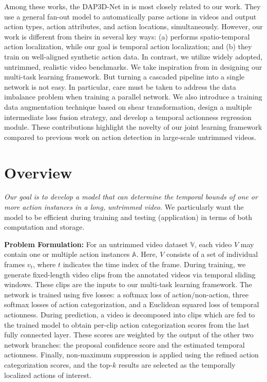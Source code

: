 \documentclass[10pt,twocolumn,letterpaper]{article}
\begin{document}
Among these works, the DAP3D-Net in \cite{DAP3D2016} is most closely related to our work. They use a general fan-out model to automatically parse actions in videos and  output action types, action attributes, and action locations, simultaneously. However, our work is different from theirs in several key ways: (a) \cite{DAP3D2016} performs spatio-temporal action localization, while our goal is temporal action localization; and (b) they train on well-aligned synthetic action data. In contrast, we utilize widely adopted, untrimmed, realistic video benchmarks.
We take inspiration from \cite{scnn_shou_wang_chang_cvpr16} in designing our multi-task learning framework. But turning a cascaded pipeline into a single network is not easy. In particular, care must be taken to address the data imbalance problem when training a parallel network. 
We also introduce a training data augmentation technique based on shear transformation, design a multiple intermediate loss fusion strategy, and develop a temporal actionness regression module. These contributions highlight the novelty of our joint learning framework compared to previous work on action detection in large-scale untrimmed videos.

\section{Overview}
\label{sec:overview}
\textit{Our goal is to develop a model that can determine the temporal bounds of one or more action instances in a long, untrimmed video.} We particularly want the model to be efficient during training and testing (application) in terms of both computation and storage.

\noindent \textbf{Problem Formulation:} 
For an untrimmed video dataset $\mathbb{V}$, each video $V$ may contain one or multiple action instances $\mathbb{A}$. 
Here, $V$ consists of a set of individual frames $v_{t}$, where $t$ indicates the time index of the frame. 
During training, we generate fixed-length video clips from the annotated videos via temporal sliding windows. These clips are the inputs to our multi-task learning framework. 
The network is trained using five losses: a softmax loss of action/non-action, three softmax losses of action categorization, and a Euclidean squared loss of temporal actionness. 
During prediction, a video is decomposed into clips which are fed to the trained model to obtain per-clip action categorization scores from the last fully connected layer.  These scores are weighted by the output of the other two network branches: the proposal confidence score and the estimated temporal actionness. Finally, non-maximum suppression is applied using the refined action categorization scores, and the top-$k$ results are selected as the temporally localized actions of interest.
\end{document}

